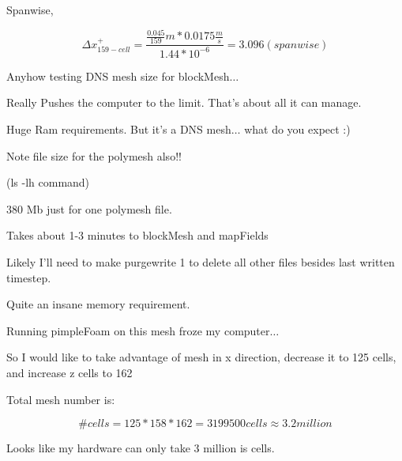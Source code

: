 \documentclass[12pt]{article}
\renewcommand{\_}{\kern-1.5pt\textunderscore\kern-1.5pt}
\begin{document}
Spanwise,\par

 \[  \Delta x_{159-cell}^{+}=\frac{\frac{0.045}{159}m\ast0.0175\frac{m}{s}}{1.44\ast10^{-6}}=3.096  \left( spanwise \right)  \] \par


\vspace{\baselineskip}

\vspace{\baselineskip}
Anyhow testing DNS mesh size for blockMesh$ \ldots $ \par

\par

Really Pushes the computer to the limit. That’s about all it can manage.\par

Huge Ram requirements. But it’s a DNS mesh$ \ldots $  what do you expect :) \par

Note file size for the polymesh also!!\par

(ls -lh command)\par

\par

380 Mb just for one polymesh file.\par

Takes about 1-3 minutes to blockMesh and mapFields\par

Likely I’ll need to make purgewrite 1 to delete all other files besides last written timestep. \par

Quite an insane memory requirement.\par

Running pimpleFoam on this mesh froze my computer$ \ldots $ \par


\vspace{\baselineskip}
So I would like to take advantage of mesh in x direction, decrease it to 125 cells, and increase z cells to 162\par

Total mesh number is:\par

 \[ \#cells=125\ast158\ast162=3199500 cells \approx 3.2 million \] \par

Looks like my hardware can only take 3 million is cells.\par
\end{document}
